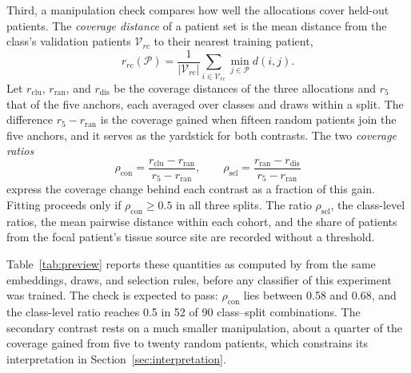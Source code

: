 \documentclass[11pt]{article}
\begin{document}
Third, a manipulation check compares how well the allocations cover held-out patients. The \emph{coverage distance} of a patient set is the mean distance from the class's validation patients $\mathcal V_{rc}$ to their nearest training patient,
\begin{equation}
 r_{rc}(\mathcal P)=\frac{1}{|\mathcal V_{rc}|}\sum_{i\in\mathcal V_{rc}}\min_{j\in\mathcal P}d(i,j).
 \label{eq:coverage}
\end{equation}
\noindent Let $r_{\mathrm{clu}}$, $r_{\mathrm{ran}}$, and $r_{\mathrm{dis}}$ be the coverage distances of the three allocations and $r_{5}$ that of the five anchors, each averaged over classes and draws within a split. The difference $r_{5}-r_{\mathrm{ran}}$ is the coverage gained when fifteen random patients join the five anchors, and it serves as the yardstick for both contrasts. The two \emph{coverage ratios}
\begin{equation}
 \rho_{\mathrm{con}}=\frac{r_{\mathrm{clu}}-r_{\mathrm{ran}}}{r_{5}-r_{\mathrm{ran}}},
 \qquad
 \rho_{\mathrm{sel}}=\frac{r_{\mathrm{ran}}-r_{\mathrm{dis}}}{r_{5}-r_{\mathrm{ran}}}
 \label{eq:ratios}
\end{equation}
\noindent express the coverage change behind each contrast as a fraction of this gain. Fitting proceeds only if $\rho_{\mathrm{con}}\ge 0.5$ in all three splits. The ratio $\rho_{\mathrm{sel}}$, the class-level ratios, the mean pairwise distance within each cohort, and the share of patients from the focal patient's tissue source site are recorded without a threshold.

Table~\ref{tab:preview} reports these quantities as computed by \citet{queisler2026concentratedCoverage} from the same embeddings, draws, and selection rules, before any classifier of this experiment was trained. The check is expected to pass: $\rho_{\mathrm{con}}$ lies between 0.58 and 0.68, and the class-level ratio reaches 0.5 in 52 of 90 class--split combinations. The secondary contrast rests on a much smaller manipulation, about a quarter of the coverage gained from five to twenty random patients, which constrains its interpretation in Section~\ref{sec:interpretation}.
\end{document}
